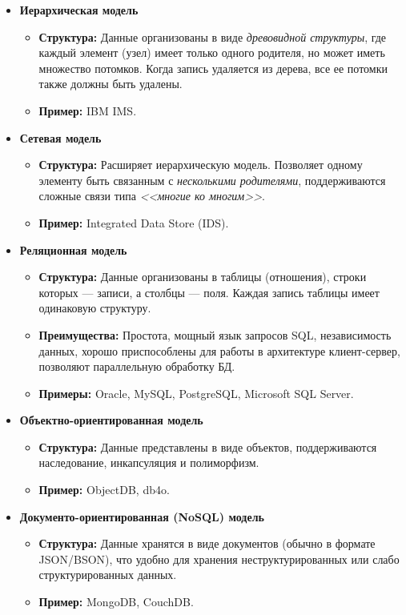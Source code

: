\documentclass[a4paper, 12pt]{report}
\numberwithin{equation}{section}
\begin{document}
\begin{itemize}
	\item \textbf{Иерархическая модель}
	\begin{itemize}
		\item \textbf{Структура:} Данные организованы в виде \textit{древовидной структуры}, где каждый элемент (узел) имеет только одного родителя, но может иметь множество потомков. Когда запись удаляется из
		дерева, все ее потомки также должны быть удалены.
		\item \textbf{Пример:} IBM IMS.
	\end{itemize}
	\item \textbf{Сетевая модель}
	\begin{itemize}
		\item \textbf{Структура:} Расширяет иерархическую модель. Позволяет одному элементу быть связанным с \textit{несколькими родителями}, поддерживаются сложные связи типа \textit{<<многие ко многим>>}.
		\item \textbf{Пример:} Integrated Data Store (IDS).
	\end{itemize}
	
	\item \textbf{Реляционная модель}
	\begin{itemize}
		\item \textbf{Структура:} Данные организованы в таблицы (отношения), строки которых --- записи, а столбцы --- поля. Каждая запись таблицы имеет одинаковую структуру. 
		\item \textbf{Преимущества:} Простота, мощный язык запросов SQL, независимость данных, хорошо приспособлены для работы в
		архитектуре клиент-сервер, позволяют параллельную обработку БД.
		\item \textbf{Примеры:} Oracle, MySQL, PostgreSQL, Microsoft SQL Server.
	\end{itemize}
	
	\item \textbf{Объектно-ориентированная модель}
	\begin{itemize}
		\item \textbf{Структура:} Данные представлены в виде объектов, поддерживаются наследование, инкапсуляция и полиморфизм.
		\item \textbf{Пример:} ObjectDB, db4o.
	\end{itemize}
	
	\item \textbf{Документо-ориентированная (NoSQL) модель}
	\begin{itemize}
		\item \textbf{Структура:} Данные хранятся в виде документов (обычно в формате JSON/BSON), что удобно для хранения неструктурированных или слабо структурированных данных.
		\item \textbf{Пример:} MongoDB, CouchDB.
	\end{itemize}
	

\end{itemize}
\end{document}
